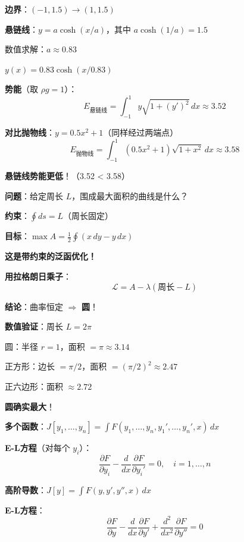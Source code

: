 \documentclass[12pt, a4paper]{ctexart}
\begin{document}
\begin{blackboard}[悬链线数值验证]

\textbf{边界}：$(-1, 1.5) \to (1, 1.5)$

\textbf{悬链线}：$y = a \cosh(x/a)$，其中 $a \cosh(1/a) = 1.5$

数值求解：$a \approx 0.83$

$y(x) = 0.83 \cosh(x/0.83)$

\textbf{势能}（取 $\rho g = 1$）：
\[
E_{\text{悬链线}} = \int_{-1}^{1} y \sqrt{1 + (y')^2} \, dx \approx \mathbf{3.52}
\]

\textbf{对比抛物线}：$y = 0.5x^2 + 1$（同样经过两端点）
\[
E_{\text{抛物线}} = \int_{-1}^{1} (0.5x^2 + 1) \sqrt{1 + x^2} \, dx \approx \mathbf{3.58}
\]

\textbf{悬链线势能更低}！（3.52 < 3.58）

\end{blackboard}

\begin{blackboard}

\textbf{问题}：给定周长 $L$，围成最大面积的曲线是什么？

\textbf{约束}：$\oint ds = L$（周长固定）

\textbf{目标}：$\max A = \frac{1}{2}\oint (x \, dy - y \, dx)$

\textbf{这是带约束的泛函优化！}

\textbf{用拉格朗日乘子}：
\[
\mathcal{L} = A - \lambda (周长 - L)
\]

\textbf{结论}：曲率恒定 $\Rightarrow$ \textbf{圆}！

\textbf{数值验证}：周长 $L = 2\pi$

圆：半径 $r = 1$，面积 $= \pi \approx \mathbf{3.14}$

正方形：边长 $= \pi/2$，面积 $= (\pi/2)^2 \approx \mathbf{2.47}$

正六边形：面积 $\approx \mathbf{2.72}$

\textbf{圆确实最大}！

\end{blackboard}

\begin{blackboard}[多变量推广]

\textbf{多个函数}：$J[y_1, \ldots, y_n] = \int F(y_1, \ldots, y_n, y_1', \ldots, y_n', x) \, dx$

\textbf{E-L方程}（对每个 $y_i$）：
\[
\frac{\partial F}{\partial y_i} - \frac{d}{dx}\frac{\partial F}{\partial y_i'} = 0, \quad i = 1, \ldots, n
\]

\textbf{高阶导数}：$J[y] = \int F(y, y', y'', x) \, dx$

\textbf{E-L方程}：
\[
\frac{\partial F}{\partial y} - \frac{d}{dx}\frac{\partial F}{\partial y'} + \frac{d^2}{dx^2}\frac{\partial F}{\partial y''} = 0
\]

\end{blackboard}
\end{document}
